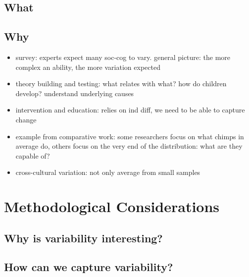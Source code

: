 \documentclass[
]{scrbook}
\providecommand{\tightlist}{%
  \setlength{\itemsep}{0pt}\setlength{\parskip}{0pt}}
\begin{document}
\subsection{What}\label{what-2}

\subsection{Why}\label{why}

\begin{itemize}
\tightlist
\item
  survey: experts expect many soc-cog to vary. general picture: the more complex an ability, the more variation expected
\item
  theory building and testing: what relates with what? how do children develop? understand underlying causes
\item
  intervention and education: relies on ind diff, we need to be able to capture change
\item
  example from comparative work: some researchers focus on what chimps in average do, others focus on the very end of the distribution: what are they capable of?
\item
  cross-cultural variation: not only average from small samples
\end{itemize}

\section{Methodological Considerations}\label{methodological-considerations}

\subsection{Why is variability interesting?}\label{why-is-variability-interesting}

\subsection{How can we capture variability?}\label{how-can-we-capture-variability}
\end{document}
